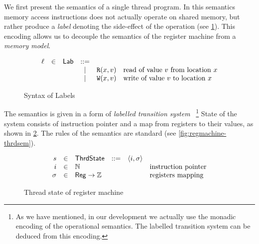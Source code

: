 We first present the semantics of a single thread program.
In this semantics memory access instructions 
does not actually operate on shared memory,
but rather produce a \emph{label}
denoting the side-effect of the operation 
(see \cref{fig:label-syntax}).
This encoding allows us to decouple 
the semantics of the register machine 
from a \emph{memory model}.

\begin{figure}[h!]
\[
\begin{array}{rclclll}

  \ell &\in& \mathsf{Lab}  &::=&                                & \text{}             \\
              & &  & | & {\mathtt{R}}({x},{v})                    & \text{read of value $v$ from location $x$}   \\
              & &  & | & {\mathtt{W}}({x},{v})                    & \text{write of value $v$ to location $x$}    \\

\end{array}
\] 
\caption{Syntax of Labels}
\label{fig:label-syntax}
\end{figure}

The semantics is given in a form of 
\emph{labelled transition system}~%
\footnote{As we have mentioned, in our \coq development we actually use 
the monadic encoding of the operational semantics. 
The labelled transition system can be deduced from this encoding.}
State of the system consists of instruction pointer
and a map from registers to their values, 
as shown in \cref{fig:regmachine-thrdstate}. 
The rules of the semantics are standard 
(see \cref{fig:regmachine-thrdsem}).

\begin{figure}[h!]
\[
\begin{array}{rclclll}

  s          &\in& \mathsf{ThrdState}    &::=& \langle i, \sigma \rangle &                         \\
  i     &\in& {\mathbb{N}}            &   &                    & \text{instruction pointer} \\
  \sigma    &\in& \mathsf{Reg} \rightarrow {\mathbb{Z}}  &   &                    & \text{registers mapping}   \\

\end{array}
\] 
\caption{Thread state of register machine}
\label{fig:regmachine-thrdstate}
\end{figure}


